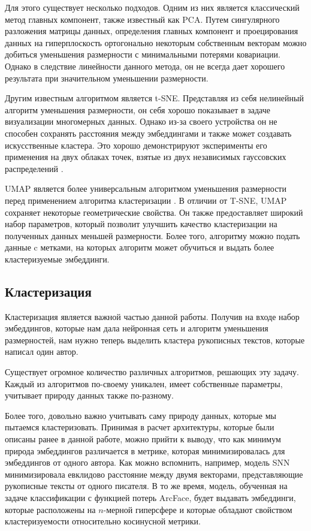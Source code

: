 Для этого существует несколько подходов. Одним из них является классический метод главных компонент, также известный как PCA. Путем сингулярного разложения матрицы данных, определения главных компонент и проецирования данных на гиперплоскость ортогонально некоторым собственным векторам можно добиться уменьшения размерности с минимальными потерями ковариации. Однако в следствие линейности данного метода, он не всегда дает хорошего результата при значительном уменьшении размерности.

Другим известным алгоритмом является t-SNE. Представляя из себя нелинейный алгоритм уменьшения размерности, он себя хорошо показывает в задаче визуализации многомерных данных. Однако из-за своего устройства он не способен сохранять расстояния между эмбеддингами и также может создавать искусственные кластера. Это хорошо демонстрируют эксперименты его применения на двух облаках точек, взятые из двух независимых гауссовских распределений \cite{pca_bad}.

UMAP является более универсальным алгоритмом уменьшения размерности перед применением алгоритма кластеризации \cite{umap}. В отличии от T-SNE, UMAP сохраняет некоторые геометрические свойства. Он также предоставляет широкий набор параметров, который позволит улучшить качество кластеризации на полученных данных меньшей размерности. Более того, алгоритму можно подать данные c метками, на которых алгоритм может обучиться и выдать более кластеризуемые эмбеддинги.

\subsection{Кластеризация}

Кластеризация является важной частью данной работы. Получив на входе набор эмбеддингов, которые нам дала нейронная сеть и алгоритм уменьшения размерностей, нам нужно теперь выделить кластера рукописных текстов, которые написал один автор. 

Существует огромное количество различных алгоритмов, решающих эту задачу. Каждый из алгоритмов по-своему уникален, имеет собственные параметры, учитывает природу данных также по-разному. 

Более того, довольно важно учитывать саму природу данных, которые мы пытаемся кластеризовать. Принимая в расчет архитектуры, которые были описаны ранее в данной работе, можно прийти к выводу, что как минимум природа эмбеддингов различается в метрике, которая минимизировалась для эмбеддингов от одного автора. Как можно вспомнить, например, модель SNN минимизировала евклидово расстояние между двумя векторами, представляющие рукописные тексты от одного писателя. В то же время, модель, обученная на задаче классификации с функцией потерь ArcFace, будет выдавать эмбеддинги, которые расположены на $n$-мерной гиперсфере и которые обладают свойством кластеризуемости относительно косинусной метрики.


